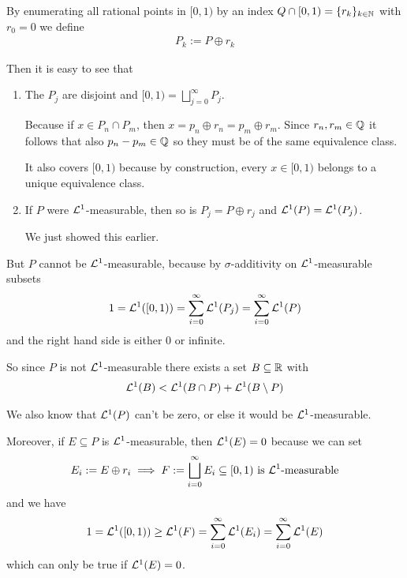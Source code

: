 By enumerating all rational points in $[0,1)$ by an index $Q \cap [0,1) = \{r_k\}_{k \in \mathbb{N}}$ with $r_0 = 0$ we define
\begin{align*}
  P_k := P \oplus r_k
\end{align*}

Then it is easy to see that
\begin{enumerate}
  \item The $P_j$ are disjoint and $[0,1) = \bigsqcup_{j=0}^{\infty}P_j$.

    Because if $x \in P_n \cap P_m$, then $x = p_n \oplus r_n = p_m \oplus r_m$. 
    Since $r_n,r_m \in \mathbb{Q}$ it follows that also $p_n-p_m \in \mathbb{Q}$ so they must be of the same equivalence class.

    It also covers $[0,1)$ because by construction, every $x \in [0,1)$ belongs to a unique equivalence class.

  \item If $P$ were $\mathcal{L}^{1}$-measurable, then so is $P_j = P \oplus r_j$ and $\mathcal{L}^{1}(P) = \mathcal{L}^{1}(P_j)$.

    We just showed this earlier.
\end{enumerate}
But $P$ cannot be $\mathcal{L}^{1}$-measurable, because by $\sigma$-additivity on $\mathcal{L}^{1}$-measurable subsets
\begin{align*}
  1 = \mathcal{L}^{1}([0,1)) = \sum_{i=0}^{\infty}\mathcal{L}^{1}(P_j) = \sum_{i=0}^{\infty} \mathcal{L}^{1}(P)
\end{align*}
and the right hand side is either $0$ or infinite.

So since $P$ is not $\mathcal{L}^{1}$-measurable there exists a set $B \subseteq \mathbb{R}$ with
\begin{align*}
  \mathcal{L}^{1}(B) < \mathcal{L}^{1}(B \cap P) + \mathcal{L}^{1}(B \setminus P)
\end{align*}

We also know that $\mathcal{L}^{1}(P)$ can't be zero, or else it would be $\mathcal{L}^{1}$-measurable.

Moreover, if $E \subseteq P$ is $\mathcal{L}^{1}$-measurable, then $\mathcal{L}^{1}(E) = 0$ because we can set
\begin{align*}
  E_i := E \oplus r_i \implies F := \bigsqcup_{i=0}^{\infty} E_i \subseteq [0,1) \text{ is $\mathcal{L}^{1}$-measurable}
\end{align*}
and we have
\begin{align*}
  1 = \mathcal{L}^{1}([0,1)) \geq \mathcal{L}^{1}(F) = \sum_{i=0}^{\infty}\mathcal{L}^{1}(E_i) = \sum_{i=0}^{\infty}\mathcal{L}^{1}(E)
\end{align*}
which can only be true if $\mathcal{L}^{1}(E) = 0$.


